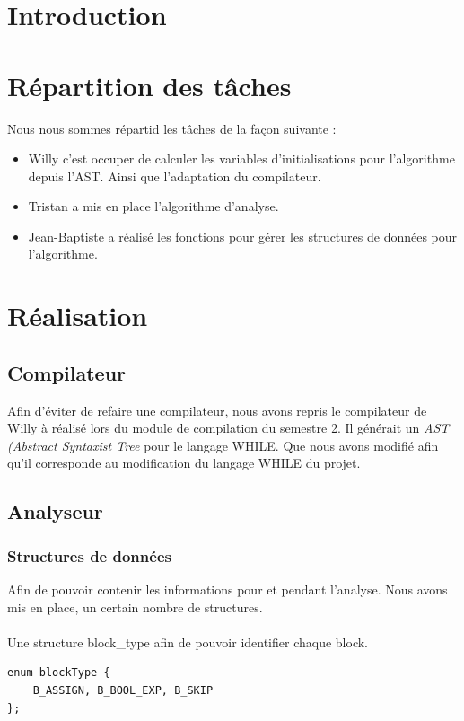 \documentclass[12pt,a4paper,oneside]{article}
\begin{document}
\tableofcontents

\newpage

\section{Introduction}

\section{Répartition des tâches}
Nous nous sommes répartid les tâches de la façon suivante :
\begin{itemize}
\item Willy c'est occuper de calculer les variables d'initialisations pour l'algorithme depuis l'AST. Ainsi que l'adaptation du compilateur.
\item Tristan a mis en place l'algorithme d'analyse.
\item Jean-Baptiste a réalisé les fonctions pour gérer les structures de données pour l'algorithme.
\end{itemize}

\section{Réalisation}
\subsection{Compilateur}
Afin d'éviter de refaire une compilateur, nous avons repris le compilateur de Willy à réalisé lors du module de compilation du semestre 2. Il générait un \emph{AST (Abstract Syntaxist Tree} pour le langage WHILE. Que nous avons modifié afin qu'il corresponde au modification du langage WHILE du projet.

\subsection{Analyseur}
\subsubsection{Structures de données}
Afin de pouvoir contenir les informations pour et pendant l'analyse. Nous avons mis en place, un certain nombre de structures.

\paragraph{}
Une structure block\_type afin de pouvoir identifier chaque block.
\begin{lstlisting}
enum blockType {
	B_ASSIGN, B_BOOL_EXP, B_SKIP
};
\end{lstlisting}
\end{document}
